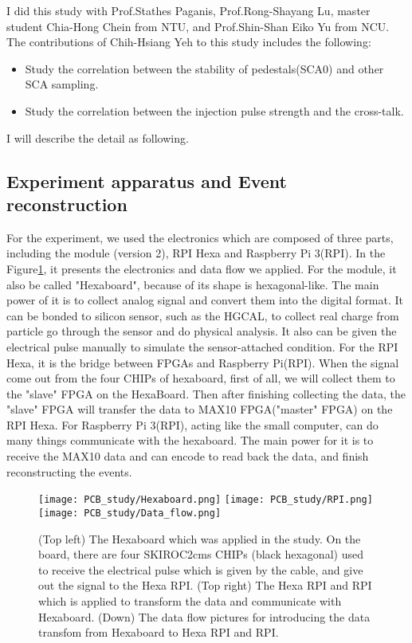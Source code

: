 \documentclass[12pt,twoside,a4paper,an,final]{cms-tdr}
\begin{document}
I did this study with Prof.Stathes Paganis, Prof.Rong-Shayang Lu, master student Chia-Hong Chein from NTU, and Prof.Shin-Shan Eiko Yu from NCU.  The contributions of Chih-Hsiang Yeh to this study includes the following:
\begin{itemize}
\item Study the correlation between the stability of pedestals(SCA0) and other SCA sampling.
\item Study the correlation between the injection pulse strength and the cross-talk.
\end{itemize}
I will describe the detail as following.

\subsection{Experiment apparatus and Event reconstruction}

For the experiment, we used the electronics which are composed of three parts, including the module (version 2), RPI Hexa and Raspberry Pi 3(RPI). In the Figure\ref{fig:PCB_study_apparatus}, it presents the electronics and data flow we applied. For the module, it also be called "Hexaboard", because of its shape is hexagonal-like. The main power of it is to collect analog signal and convert them into the digital format. It can be bonded to silicon sensor, such as the HGCAL, to collect real charge from particle go through the sensor and do physical analysis. It also can be given the electrical pulse manually to simulate the sensor-attached condition. For the RPI Hexa, it is the bridge between FPGAs and Raspberry Pi(RPI). When the signal come out from the four CHIPs of hexaboard, first of all, we will collect them to the "slave" FPGA on the HexaBoard. Then after finishing collecting the data, the "slave" FPGA will transfer the data to MAX10 FPGA("master" FPGA) on the RPI Hexa. For Raspberry Pi 3(RPI), acting like the small computer, can do many things communicate with the hexaboard. The main power for it is to receive the MAX10 data and can encode to read back the data, and finish reconstructing the events.

\begin{figure}[!htb]
\centering
     \texttt{[image: PCB\_study/Hexaboard.png]}
     \texttt{[image: PCB\_study/RPI.png]}\\
     \texttt{[image: PCB\_study/Data\_flow.png]}
\caption{(Top left) The Hexaboard which was applied in the study. On the board, there are four SKIROC2cms CHIPs (black hexagonal) used to receive the electrical pulse which is given by the cable, and give out the signal to the Hexa RPI. (Top right) The Hexa RPI and RPI which is applied to transform the data and communicate with Hexaboard. (Down) The data flow pictures for introducing the data transfom from Hexaboard to Hexa RPI and RPI.
}
\label{fig:PCB_study_apparatus}
\end{figure}
\end{document}

